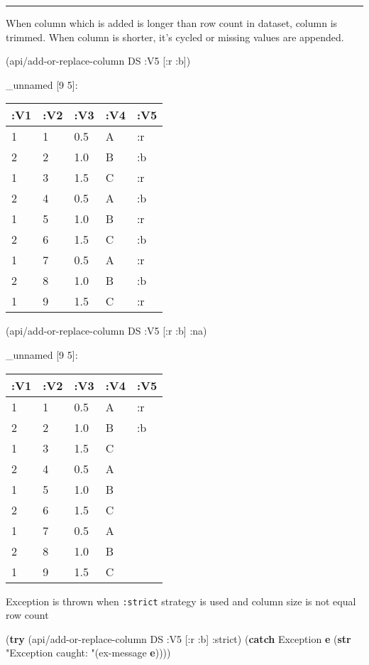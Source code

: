 \documentclass[]{article}
\newenvironment{Shaded}{\begin{snugshade}}{\end{snugshade}}
\newcommand{\AttributeTok}[1]{\textcolor[rgb]{0.77,0.63,0.00}{#1}}
\newcommand{\KeywordTok}[1]{\textcolor[rgb]{0.13,0.29,0.53}{\textbf{#1}}}
\newcommand{\NormalTok}[1]{#1}
\newcommand{\StringTok}[1]{\textcolor[rgb]{0.31,0.60,0.02}{#1}}
\begin{document}
\begin{center}\rule{0.5\linewidth}{0.5pt}\end{center}

When column which is added is longer than row count in dataset, column
is trimmed. When column is shorter, it's cycled or missing values are
appended.

\begin{Shaded}
\begin{Highlighting}[]
\NormalTok{(api/add-or-replace-column DS }\AttributeTok{:V5}\NormalTok{ [}\AttributeTok{:r} \AttributeTok{:b}\NormalTok{])}
\end{Highlighting}
\end{Shaded}

\_unnamed {[}9 5{]}:

\begin{longtable}[]{@{}lllll@{}}
\toprule
:V1 & :V2 & :V3 & :V4 & :V5\tabularnewline
\midrule
\endhead
1 & 1 & 0.5 & A & :r\tabularnewline
2 & 2 & 1.0 & B & :b\tabularnewline
1 & 3 & 1.5 & C & :r\tabularnewline
2 & 4 & 0.5 & A & :b\tabularnewline
1 & 5 & 1.0 & B & :r\tabularnewline
2 & 6 & 1.5 & C & :b\tabularnewline
1 & 7 & 0.5 & A & :r\tabularnewline
2 & 8 & 1.0 & B & :b\tabularnewline
1 & 9 & 1.5 & C & :r\tabularnewline
\bottomrule
\end{longtable}

\begin{Shaded}
\begin{Highlighting}[]
\NormalTok{(api/add-or-replace-column DS }\AttributeTok{:V5}\NormalTok{ [}\AttributeTok{:r} \AttributeTok{:b}\NormalTok{] }\AttributeTok{:na}\NormalTok{)}
\end{Highlighting}
\end{Shaded}

\_unnamed {[}9 5{]}:

\begin{longtable}[]{@{}lllll@{}}
\toprule
:V1 & :V2 & :V3 & :V4 & :V5\tabularnewline
\midrule
\endhead
1 & 1 & 0.5 & A & :r\tabularnewline
2 & 2 & 1.0 & B & :b\tabularnewline
1 & 3 & 1.5 & C &\tabularnewline
2 & 4 & 0.5 & A &\tabularnewline
1 & 5 & 1.0 & B &\tabularnewline
2 & 6 & 1.5 & C &\tabularnewline
1 & 7 & 0.5 & A &\tabularnewline
2 & 8 & 1.0 & B &\tabularnewline
1 & 9 & 1.5 & C &\tabularnewline
\bottomrule
\end{longtable}

Exception is thrown when \texttt{:strict} strategy is used and column
size is not equal row count

\begin{Shaded}
\begin{Highlighting}[]
\NormalTok{(}\KeywordTok{try}
\NormalTok{  (api/add-or-replace-column DS }\AttributeTok{:V5}\NormalTok{ [}\AttributeTok{:r} \AttributeTok{:b}\NormalTok{] }\AttributeTok{:strict}\NormalTok{)}
\NormalTok{  (}\KeywordTok{catch}\NormalTok{ Exception }\KeywordTok{e}\NormalTok{ (}\KeywordTok{str} \StringTok{"Exception caught: "}\NormalTok{(ex-message }\KeywordTok{e}\NormalTok{))))}
\end{Highlighting}
\end{Shaded}
\end{document}
